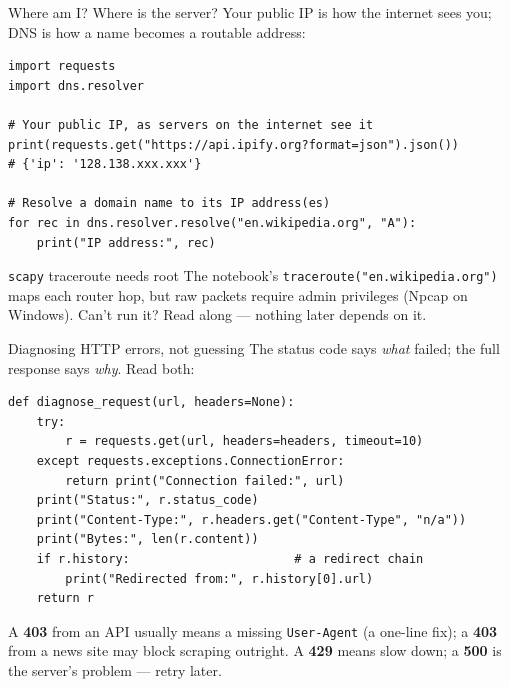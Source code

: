 \documentclass[9pt,aspectratio=169]{beamer}
\begin{document}
\begin{frame}[fragile]{Where am I? Where is the server?}
    Your public IP is how the internet sees you; DNS is how a name becomes a routable address:
\begin{lstlisting}
import requests
import dns.resolver

# Your public IP, as servers on the internet see it
print(requests.get("https://api.ipify.org?format=json").json())
# {'ip': '128.138.xxx.xxx'}

# Resolve a domain name to its IP address(es)
for rec in dns.resolver.resolve("en.wikipedia.org", "A"):
    print("IP address:", rec)
\end{lstlisting}
    \begin{alertblock}{\texttt{scapy} traceroute needs root}
        \footnotesize The notebook's \texttt{traceroute("en.wikipedia.org")} maps each router hop, but raw packets require admin privileges (Npcap on Windows). Can't run it? Read along --- nothing later depends on it.
    \end{alertblock}
\end{frame}

\begin{frame}[fragile]{Diagnosing HTTP errors, not guessing}
    The status code says \emph{what} failed; the full response says \emph{why}. Read both:
\begin{lstlisting}
def diagnose_request(url, headers=None):
    try:
        r = requests.get(url, headers=headers, timeout=10)
    except requests.exceptions.ConnectionError:
        return print("Connection failed:", url)
    print("Status:", r.status_code)
    print("Content-Type:", r.headers.get("Content-Type", "n/a"))
    print("Bytes:", len(r.content))
    if r.history:                       # a redirect chain
        print("Redirected from:", r.history[0].url)
    return r
\end{lstlisting}
    A \textbf{403} from an API usually means a missing \texttt{User-Agent} (a one-line fix); a \textbf{403} from a news site may block scraping outright. A \textbf{429} means slow down; a \textbf{500} is the server's problem --- retry later.
\end{frame}
\end{document}
